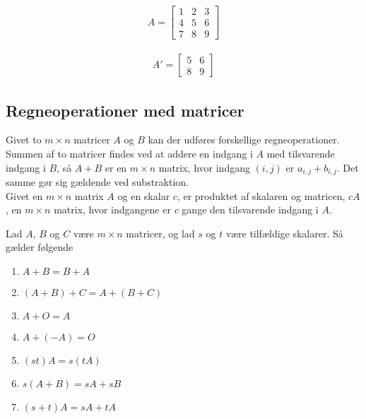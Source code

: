 \begin{align*}
A = \begin{bmatrix}
	1 & 2 & 3 \\
	4 & 5 & 6 \\
	7 & 8 & 9 
\end{bmatrix}
\end{align*}

\begin{align*}
A' = \begin{bmatrix}
	5 & 6 \\
	8 & 9
\end{bmatrix}
\end{align*}



\subsection{Regneoperationer med matricer}
Givet to $m \times n$ matricer $A$ og $B$ kan der udføres forskellige regneoperationer. 
Summen af to matricer findes ved at addere en indgang i $A$ med tilsvarende indgang i $B$, så $A+B$ er en $m \times n$ matrix, hvor indgang $(i,j)$ er $a_{i,j}+b_{i,j}$. 
Det samme gør sig gældende ved substraktion. \\
Givet en $m \times n$ matrix $A$ og en skalar $c$, er produktet af skalaren og matricen, $cA$, en $m \times n$ matrix, hvor indgangene er $c$ gange den tilsvarende indgang i $A$. \\

\begin{stn}
Lad $A$, $B$ og $C$ være $m \times n$ matricer, og lad $s$ og $t$ være tilfældige skalarer. 
Så gælder følgende
\begin{enumerate}[label=(\alph*)]
\item $A + B = B + A$
\item $(A + B) + C = A + (B + C)$
\item $A + O = A$
\item $A + (-A) = O$
\item $(st) A = s (tA)$
\item $s(A + B) = sA + sB$
\item $(s+t)A = sA + tA$
\end{enumerate}
\label{stn_regn}
\end{stn}

